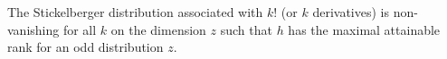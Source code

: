 The Stickelberger distribution associated with $k!$ (or $k$ derivatives) is non-vanishing for all $k$ on the dimension $z$ such that $h$ has the maximal attainable rank for an odd distribution $z$.
